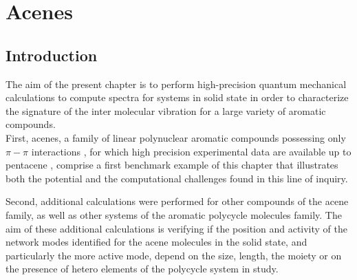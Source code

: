 \chapter[Phonon calculation]{Acenes}
\minitoc
\restoregeometry

\newpage


\section*{Introduction}

The aim of the present chapter is to perform high-precision quantum mechanical calculations to compute spectra for systems in solid state in order to characterize the signature of the inter molecular vibration for a large variety of aromatic compounds.\\

First, acenes, a family of linear polynuclear aromatic compounds possessing only $\pi-\pi$ interactions \cite{campbell1962crystal,mattheus2001polymorphism,brock1982temperature,facelli1993determination,brock1990temperature}, for which high precision experimental data are available up to pentacene \cite{michaelian2012far}, comprise a first benchmark example of this chapter that illustrates both the potential and the computational challenges found in this line of inquiry.

Second, additional calculations were performed for other compounds of the acene family, as well as other systems of the aromatic polycycle molecules family. The aim of these additional calculations is verifying if the position and activity of the network modes identified for the acene molecules in the solid state, and particularly the more active mode, depend on the size, length, the moiety or on the presence of hetero elements of the polycycle system in study.\\



